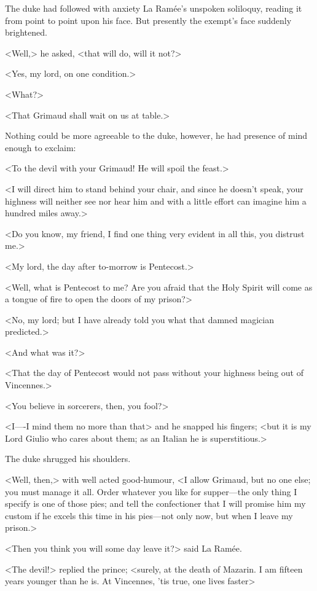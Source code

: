 The duke had followed with anxiety La Ramée's unspoken soliloquy, reading it from point to point upon his face. But presently the exempt's face suddenly brightened.

<Well,> he asked, <that will do, will it not?>

<Yes, my lord, on one condition.>

<What?>

<That Grimaud shall wait on us at table.>

Nothing could be more agreeable to the duke, however, he had presence of mind enough to exclaim:

<To the devil with your Grimaud! He will spoil the feast.>

<I will direct him to stand behind your chair, and since he doesn't speak, your highness will neither see nor hear him and with a little effort can imagine him a hundred miles away.>

<Do you know, my friend, I find one thing very evident in all this, you distrust me.>

<My lord, the day after to-morrow is Pentecost.>

<Well, what is Pentecost to me? Are you afraid that the Holy Spirit will come as a tongue of fire to open the doors of my prison?>

<No, my lord; but I have already told you what that damned magician predicted.>

<And what was it?>

<That the day of Pentecost would not pass without your highness being out of Vincennes.>

<You believe in sorcerers, then, you fool?>

<I—-I mind them no more than that\longdash> and he snapped his fingers; <but it is my Lord Giulio who cares about them; as an Italian he is superstitious.>

The duke shrugged his shoulders.

<Well, then,> with well acted good-humour, <I allow Grimaud, but no one else; you must manage it all. Order whatever you like for supper—the only thing I specify is one of those pies; and tell the confectioner that I will promise him my custom if he excels this time in his pies—not only now, but when I leave my prison.>

<Then you think you will some day leave it?> said La Ramée.

<The devil!> replied the prince; <surely, at the death of Mazarin. I am fifteen years younger than he is. At Vincennes, 'tis true, one lives faster\longdash>


